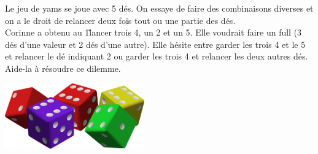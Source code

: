 \begin{TP}[Full]
Le jeu de yams se joue avec 5 dés. On essaye de faire des combinaisons diverses et on a le droit de relancer deux fois tout ou une partie des dés.\\
Corinne a obtenu au 1\ier\~lancer trois 4, un 2 et un 5. Elle voudrait faire un full (3 dés d'une valeur et 2 dés d'une autre). Elle hésite entre garder les trois 4 et le 5 et relancer le  dé indiquant 2 ou garder les trois 4 et relancer les deux autres dés. Aide-la à résoudre ce dilemme.

\vspace{1cm}
\begin{center}
 \includegraphics[width=6cm]{./2SP3/images/Five_dice_02.eps}
\end{center}

\end{TP}

